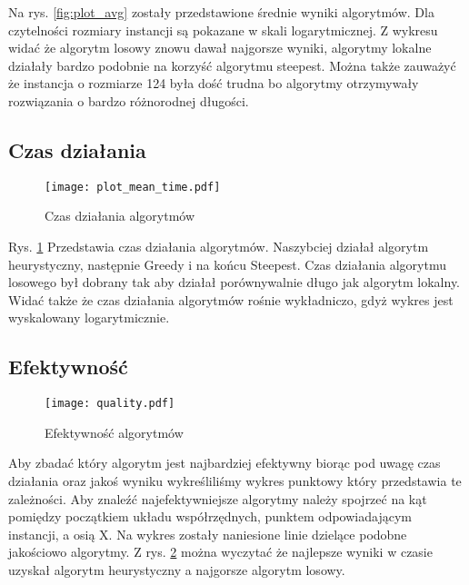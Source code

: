 \documentclass{article}
\begin{document}
Na rys. \ref{fig:plot_avg} zostały przedstawione średnie wyniki algorytmów. Dla czytelności rozmiary instancji są pokazane w skali logarytmicznej. Z wykresu widać że algorytm losowy znowu dawał najgorsze wyniki, algorytmy lokalne działały bardzo podobnie na korzyść algorytmu steepest. Można także zauważyć że instancja o rozmiarze 124 była dość trudna bo algorytmy otrzymywały rozwiązania o bardzo różnorodnej długości.

\subsection{Czas działania}

\begin{figure}[H]
\begin{center}
    \texttt{[image: plot\_mean\_time.pdf]}
\end{center}
\caption{Czas działania algorytmów}
\label{fig:plot_time}
\end{figure}

Rys. \ref{fig:plot_time} Przedstawia czas działania algorytmów. Naszybciej działał algorytm heurystyczny, następnie Greedy i na końcu Steepest. Czas działania algorytmu losowego był dobrany tak aby działał porównywalnie długo jak algorytm lokalny. Widać także że czas działania algorytmów rośnie wykładniczo, gdyż wykres jest wyskalowany logarytmicznie.


\subsection{Efektywność}


\begin{figure}[H]
\begin{center}
\texttt{[image: quality.pdf]}
\end{center}
\caption{Efektywność algorytmów}
\label{fig:plot_quality}
\end{figure}

Aby zbadać który algorytm jest najbardziej efektywny biorąc pod uwagę czas działania oraz jakoś wyniku wykreśliliśmy wykres punktowy który przedstawia te zależności. Aby znaleźć najefektywniejsze algorytmy należy spojrzeć na kąt pomiędzy początkiem układu współrzędnych, punktem odpowiadającym instancji, a osią X. Na wykres zostały naniesione linie dzielące podobne jakościowo algorytmy. Z rys. \ref{fig:plot_quality} można wyczytać że najlepsze wyniki w czasie uzyskał algorytm heurystyczny a najgorsze algorytm losowy.
\end{document}
